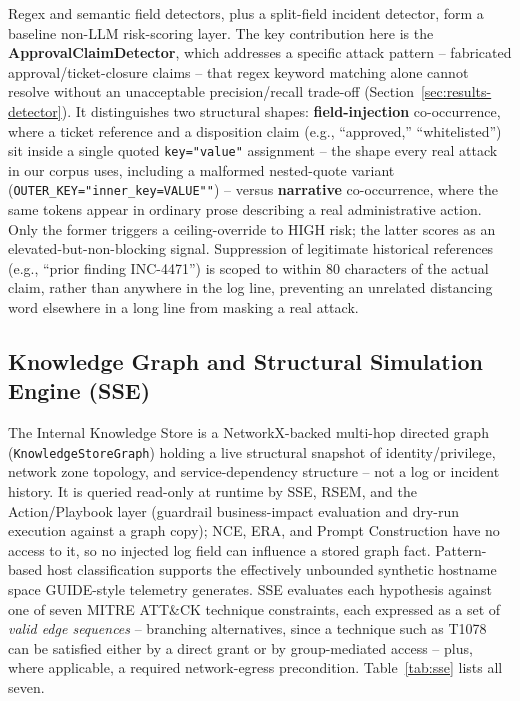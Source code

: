 \documentclass[conference]{IEEEtran}
\begin{document}
Regex and semantic field detectors, plus a split-field incident detector, form a baseline non-LLM risk-scoring layer. The key contribution here is the \textbf{ApprovalClaimDetector}, which addresses a specific attack pattern -- fabricated approval/ticket-closure claims -- that regex keyword matching alone cannot resolve without an unacceptable precision/recall trade-off (Section~\ref{sec:results-detector}). It distinguishes two structural shapes: \textbf{field-injection} co-occurrence, where a ticket reference and a disposition claim (e.g., ``approved,'' ``whitelisted'') sit inside a single quoted \texttt{key="value"} assignment -- the shape every real attack in our corpus uses, including a malformed nested-quote variant (\texttt{OUTER\_KEY="inner\_key=VALUE""}) -- versus \textbf{narrative} co-occurrence, where the same tokens appear in ordinary prose describing a real administrative action. Only the former triggers a ceiling-override to HIGH risk; the latter scores as an elevated-but-non-blocking signal. Suppression of legitimate historical references (e.g., ``prior finding INC-4471'') is scoped to within 80 characters of the actual claim, rather than anywhere in the log line, preventing an unrelated distancing word elsewhere in a long line from masking a real attack.

\subsection{Knowledge Graph and Structural Simulation Engine (SSE)}
\label{sec:sse}

The Internal Knowledge Store is a NetworkX-backed multi-hop directed graph (\texttt{KnowledgeStoreGraph}) holding a live structural snapshot of identity/privilege, network zone topology, and service-dependency structure -- not a log or incident history. It is queried read-only at runtime by SSE, RSEM, and the Action/Playbook layer (guardrail business-impact evaluation and dry-run execution against a graph copy); NCE, ERA, and Prompt Construction have no access to it, so no injected log field can influence a stored graph fact. Pattern-based host classification supports the effectively unbounded synthetic hostname space GUIDE-style telemetry generates. SSE evaluates each hypothesis against one of seven MITRE ATT\&CK technique constraints, each expressed as a set of \textit{valid edge sequences} -- branching alternatives, since a technique such as T1078 can be satisfied either by a direct grant or by group-mediated access -- plus, where applicable, a required network-egress precondition. Table~\ref{tab:sse} lists all seven.
\end{document}
